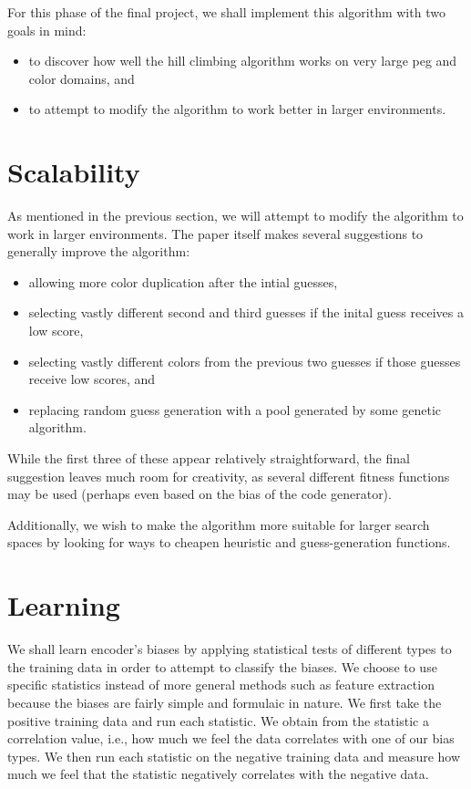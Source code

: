 \documentclass[11pt,twocolumn]{article}
\begin{document}
For this phase of the final project, we shall implement this algorithm with two goals in mind:

\begin{itemize}
\item to discover how well the hill climbing algorithm works on very large peg and color domains, and 
\item to attempt to modify the algorithm to work better in larger environments.
\end{itemize}

\section{Scalability} 

As mentioned in the previous section, we will attempt to modify the algorithm to work in larger environments. The paper itself makes several suggestions to generally improve the algorithm:

\begin{itemize}
\item allowing more color duplication after the intial guesses, 
\item selecting vastly different second and third guesses if the inital guess receives a low score,
\item selecting vastly different colors from the previous two guesses if those guesses receive low scores, and
\item replacing random guess generation with a pool generated by some genetic algorithm.


\end{itemize}


While the first three of these appear relatively straightforward, the final suggestion leaves much room for creativity, as several different fitness functions may be used (perhaps even based on the bias of the code generator). 

Additionally, we wish to make the algorithm more suitable for larger search spaces by looking for ways to cheapen heuristic and guess-generation functions.
 
\section{Learning} 

We shall learn encoder's biases by applying statistical tests of different types to the training data in order
to attempt to classify the biases. We choose to use specific statistics instead of more general methods
such as feature extraction because the biases are fairly simple and formulaic in nature. We first take the
positive training data and run each statistic. We obtain from the statistic a correlation value, i.e., how
much we feel the data correlates with one of our bias types. We then run each statistic on the negative
training data and measure how much we feel that the statistic negatively correlates with the negative
data.
\end{document}
